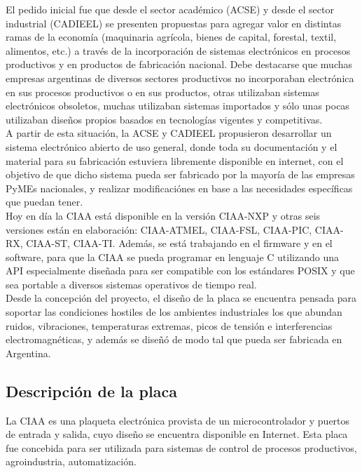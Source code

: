 \documentclass[12pt,letterpaper]{article}
\begin{document}
El pedido inicial fue que desde el sector académico (ACSE) y desde el sector industrial (CADIEEL) se presenten propuestas para agregar valor en distintas ramas de la economía (maquinaria agrícola, bienes de capital, forestal, textil, alimentos, etc.) a través de la incorporación de sistemas electrónicos en procesos productivos y en productos de fabricación nacional. Debe destacarse que muchas empresas argentinas de diversos sectores productivos no incorporaban electrónica en sus procesos productivos o en sus productos, otras utilizaban sistemas electrónicos obsoletos, muchas utilizaban sistemas importados y sólo unas pocas utilizaban diseños propios basados en tecnologías vigentes y competitivas.
  \\

A partir de esta situación, la ACSE y CADIEEL propusieron desarrollar un sistema electrónico abierto de uso general, donde toda su documentación y el material para su fabricación estuviera libremente disponible en internet, con el objetivo de que dicho sistema pueda ser fabricado por la mayoría de las empresas PyMEs nacionales, y realizar modificaciónes en base a las necesidades específicas que puedan tener.
  \\

Hoy en día la CIAA está disponible en la versión CIAA-NXP y otras seis versiones están en elaboración: CIAA-ATMEL, CIAA-FSL, CIAA-PIC, CIAA-RX, CIAA-ST, CIAA-TI. Además, se está trabajando en el firmware y en el software, para que la CIAA se pueda programar en lenguaje C utilizando una API especialmente diseñada para ser compatible con los estándares POSIX y que sea portable a diversos sistemas operativos de tiempo real.
  \\

Desde la concepción del proyecto, el diseño de la placa se encuentra pensada para soportar las condiciones hostiles de los ambientes industriales los que abundan ruidos, vibraciones, temperaturas extremas, picos de tensión e interferencias electromagnéticas, y además se diseñó de modo tal que pueda ser fabricada en Argentina.

\subsection{Descripción de la placa}

La CIAA es una plaqueta electrónica provista de un microcontrolador y puertos de entrada y salida, cuyo diseño se encuentra disponible en Internet. Esta placa fue concebida para ser utilizada para sistemas de control de procesos productivos, agroindustria, automatización.
 \\
 
\end{document}
